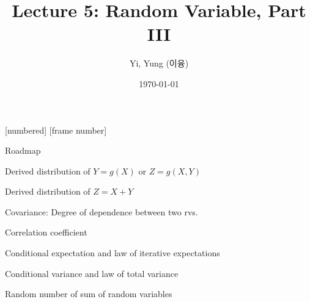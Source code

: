 

\csname\pdfmode\endcsname

{
  [numbered]
  [frame number]  %
}



\title[]{Lecture 5: Random Variable, Part III}
\author{Yi, Yung (이융)}
\date{\today}









\begin{frame}
  \titlepage
\end{frame}




\begin{frame}{Roadmap}

\plitemsep 0.1in

\bce[(1)]


\item Derived distribution of $Y=g(X)$ or $Z=g(X,Y)$

\item Derived distribution of $Z=X+Y$

\item Covariance: Degree of dependence between two rvs.

\item Correlation coefficient

\item Conditional expectation and law of iterative expectations

\item Conditional variance and law of total variance

\item Random number of sum of random variables

\ece



\end{frame}

